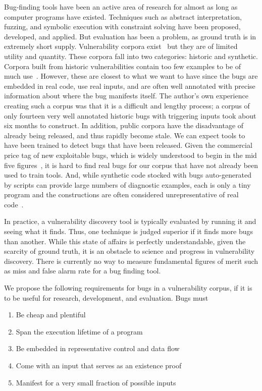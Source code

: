 \label{sec:motivation}

Bug-finding tools have been an active area of research for almost as long as computer programs have existed. 
Techniques such as abstract interpretation, fuzzing, and symbolic execution with constraint solving have been proposed, developed, and applied.
But evaluation has been a problem, as  ground truth is in extremely short supply.
Vulnerability corpora exist~\cite{Kass:2005} but they are of limited utility and quantity.
These corpora fall into two categories: historic and synthetic.
Corpora built from historic vulnerabilities contain too few examples to be of much use~\cite{Zitser:2004}.
However, these are closest to what we want to have since the bugs are embedded in real code, use real inputs, and are often well annotated with precise information about where the bug manifests itself.
The author's own experience creating such a corpus was that it is a difficult and lengthy process; a corpus of only fourteen very well annotated historic bugs with triggering inputs took about six months to construct. 
In addition, public corpora have the disadvantage of already being released, and thus rapidly become stale.
We can expect tools to have been trained to detect bugs that have been released.
Given the commercial price tag of new exploitable bugs, which is widely understood to begin in the mid five figures~\cite{Tsyrklevich:2015}, it is hard to find real bugs for our corpus that have not already been used to train tools.
And, while synthetic code stocked with bugs auto-generated by scripts can provide large numbers of diagnostic examples, each is only a tiny program and the constructions are often considered unrepresentative of real code~\cite{Juliet:2012,Kratkiewicz:2005}.

In practice, a vulnerability discovery tool is typically evaluated by running it and seeing what it finds. 
Thus, one technique is judged superior if it finds more bugs than another.
While this state of affairs is perfectly understandable, given the scarcity of ground truth, it is an obstacle to science and progress in vulnerability discovery.
There is currently no way to measure fundamental figures of merit such as miss and false alarm rate for a bug finding tool.

We propose the following requirements for bugs in a vulnerability corpus, if it is to be useful for research, development, and evaluation.
Bugs must

\begin{enumerate}
\item Be cheap and plentiful
\item Span the execution lifetime of a program
\item Be embedded in representative control and data flow
\item Come with an input that serves as an existence proof 
\item Manifest for a very small fraction of possible inputs
\end {enumerate}

